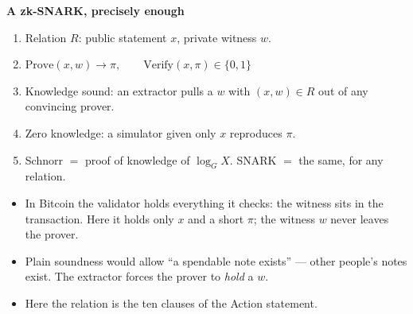 \documentclass[11pt]{article}
\newcommand{\nfsym}{\ensuremath{\mathsf{nf}}}
\newcommand{\cmx}{\ensuremath{\mathsf{cmx}}}
\newcommand{\cvsym}{\ensuremath{\mathsf{cv}}}
\newcommand{\rksym}{\ensuremath{\mathsf{rk}}}
\newcounter{board}
\newenvironment{board}[2]{\clearpage\stepcounter{board}%
  \sbox{\bdlabel}{\small\color{arbdim}#2}%
  \noindent\parbox[b]{\dimexpr\textwidth-\wd\bdlabel-1em\relax}{\raggedright
    \color{arb}\large\bfseries #1}\hfill\usebox{\bdlabel}\par
  \vspace{2pt}{\color{arb!40}\hrule}\vspace{4pt}}{\par}
\newcommand{\shead}[1]{\par\smallskip{\small\bfseries\color{arbdim}#1}\par\nopagebreak}
\newcommand{\Write}{\shead{Write}}
\newcommand{\Say}{\shead{Say}}
\begin{document}
\newcommand{\wbGZH}{\ensuremath{Z_H}}
\newcommand{\wbGlo}[1]{\ensuremath{#1_{\mathrm{lo}}}}
\newcommand{\wbGhi}[1]{\ensuremath{#1_{\mathrm{hi}}}}
\newcommand{\wbGInstanceFig}{%
\begin{tikzpicture}[x=0.82cm,y=0.82cm,font=\scriptsize]
  \fill[arbdim!30] (0,0) rectangle ++(0.74,3.6);
  \node[anchor=south] at (0.37,3.65) {fixed};
  \foreach \i in {0,...,9}
    {\fill[arb!25] (1.0+\i*0.26,0) rectangle ++(0.22,3.6);}
  \node[anchor=south] at (2.3,3.65) {advice $\times 10$};
  \fill[arbdim!15] (3.75,0) rectangle ++(0.4,3.6);
  \node[anchor=south east] at (4.25,3.65) {table};
  \foreach \i in {0,...,9}
    {\draw[fill=arbred!25] (4.75,3.28-\i*0.31) rectangle ++(0.3,0.27);}
  \draw[arbred] (4.75,0) rectangle ++(0.3,0.15);
  \node[anchor=south west] at (4.7,3.65) {instance};
  \foreach \i/\l in {0/$\mathsf{anchor}$,1/$\cvsym.x$,2/$\cvsym.y$,
      3/$\nfsym$,4/$\rksym.x$,5/$\rksym.y$,6/$\cmx$,
      7/$\mathsf{enableSpends} = 1$,8/$\mathsf{enableOutputs} = 1$,
      9/$\mathsf{disableCrossAddress} = 0$ (position unspecified)}
    {\node[anchor=west] at (5.1,3.415-\i*0.31) {\l};}
  \node[anchor=west,text=arbdim] at (5.1,0.075) {$0$ below};
  \draw[-{Stealth}] (-0.2,3.6) -- (-0.2,0)
    node[midway,left=1pt,rotate=90,anchor=south] {$2^{11}$ rows};
\end{tikzpicture}}

\begin{board}{A zk-SNARK, precisely enough}{all four checks}
\Write
\begin{enumerate}
  \item Relation $R$: public statement $x$, private witness $w$.
  \item[] $\mathrm{Prove}(x, w) \to \pi, \qquad
    \mathrm{Verify}(x, \pi) \in \{0, 1\}$
  \item Knowledge sound: an extractor pulls a $w$ with $(x, w) \in R$
    out of any convincing prover.
  \item Zero knowledge: a simulator given only $x$ reproduces $\pi$.
  \item Schnorr $=$ proof of knowledge of $\log_G X$. SNARK $=$ the
    same, for any relation.
\end{enumerate}
\Say
\begin{itemize}
  \item In Bitcoin the validator holds everything it checks: the
    witness sits in the transaction. Here it holds only $x$ and a short
    $\pi$; the witness $w$ never leaves the prover.
  \item Plain soundness would allow ``a spendable note exists'' ---
    other people's notes exist. The extractor forces the prover to
    \emph{hold} a $w$.
  \item Here the relation is the ten clauses of the Action statement.
\end{itemize}
\end{board}
\end{document}

